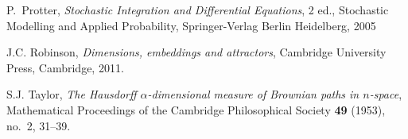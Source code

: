 \documentclass{amsart}
\begin{document}
\begin{thebibliography}{Kah85}
	P.~Protter, \emph{Stochastic Integration and Differential Equations}, 2 ed., Stochastic Modelling and Applied Probability, Springer-Verlag Berlin Heidelberg, 2005
	
	J.C. Robinson, \emph{Dimensions, embeddings and attractors}, Cambridge
	University Press, Cambridge, 2011.
	
	S.J. Taylor, \emph{The Hausdorff {$\alpha$}-dimensional measure of Brownian
		paths in {$n$}-space}, Mathematical Proceedings of the Cambridge
	Philosophical Society \textbf{49} (1953), no.~2, 31--39.
	
\end{thebibliography}
\end{document}
